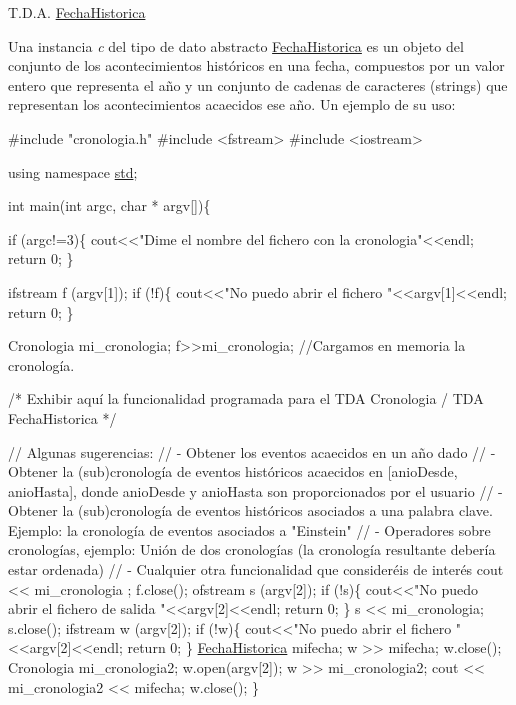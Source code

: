 T.\+D.\+A. \hyperlink{classFechaHistorica}{Fecha\+Historica}

Una instancia {\itshape c} del tipo de dato abstracto {\ttfamily \hyperlink{classFechaHistorica}{Fecha\+Historica}} es un objeto del conjunto de los acontecimientos históricos en una fecha, compuestos por un valor entero que representa el año y un conjunto de cadenas de caracteres (strings) que representan los acontecimientos acaecidos ese año. Un ejemplo de su uso\+: 
\begin{DoxyCodeInclude}

\textcolor{preprocessor}{#include "cronologia.h"}
\textcolor{preprocessor}{#include <fstream>}
\textcolor{preprocessor}{#include <iostream>}

\textcolor{keyword}{using namespace }\hyperlink{namespacestd}{std};

\textcolor{keywordtype}{int} main(\textcolor{keywordtype}{int} argc, \textcolor{keywordtype}{char} * argv[])\{



  \textcolor{keywordflow}{if} (argc!=3)\{
      cout<<\textcolor{stringliteral}{"Dime el nombre del fichero con la cronologia"}<<endl;
      \textcolor{keywordflow}{return} 0;
   \}

   ifstream f (argv[1]);
   \textcolor{keywordflow}{if} (!f)\{
    cout<<\textcolor{stringliteral}{"No puedo abrir el fichero "}<<argv[1]<<endl;
    \textcolor{keywordflow}{return} 0;
   \}
   
   Cronologia mi\_cronologia;
   f>>mi\_cronologia; \textcolor{comment}{//Cargamos en memoria la cronología.}


   \textcolor{comment}{/* Exhibir aquí la funcionalidad programada para el TDA Cronologia / TDA FechaHistorica */} 

   \textcolor{comment}{// Algunas sugerencias: }
   \textcolor{comment}{// - Obtener los eventos acaecidos en un año dado}
   \textcolor{comment}{// - Obtener la (sub)cronología de eventos históricos acaecidos en [anioDesde, anioHasta], donde
       anioDesde y anioHasta son proporcionados por el usuario}
   \textcolor{comment}{// - Obtener la (sub)cronología de eventos históricos asociados a una palabra clave. Ejemplo: la
       cronología de eventos asociados a "Einstein"}
   \textcolor{comment}{// - Operadores sobre cronologías, ejemplo: Unión de dos cronologías (la cronología resultante debería
       estar ordenada)}
   \textcolor{comment}{// - Cualquier otra funcionalidad que consideréis de interés}
   cout << mi\_cronologia ;
   f.close();
   ofstream s (argv[2]);
   \textcolor{keywordflow}{if} (!s)\{
    cout<<\textcolor{stringliteral}{"No puedo abrir el fichero de salida "}<<argv[2]<<endl;
    \textcolor{keywordflow}{return} 0;
   \}
   s << mi\_cronologia;
   s.close();
   ifstream w (argv[2]);
   \textcolor{keywordflow}{if} (!w)\{
    cout<<\textcolor{stringliteral}{"No puedo abrir el fichero "}<<argv[2]<<endl;
    \textcolor{keywordflow}{return} 0;
   \}
   \hyperlink{classFechaHistorica}{FechaHistorica} mifecha;
   w >> mifecha;
   w.close();
   Cronologia mi\_cronologia2;
   w.open(argv[2]);
   w >> mi\_cronologia2;
   cout << mi\_cronologia2 << mifecha;
   w.close();
\}
\end{DoxyCodeInclude}


